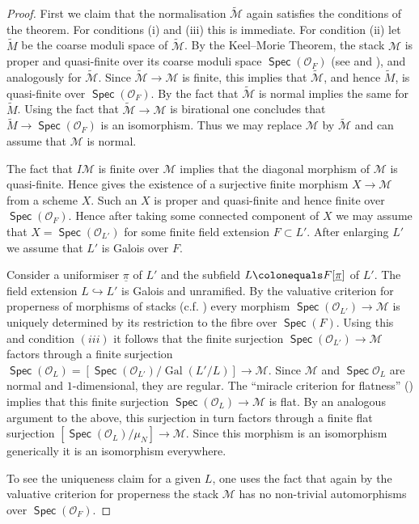 \documentclass{article}
\DeclareMathOperator{\Gal}{Gal}
\DeclareMathOperator{\Spec}{\mathsf{Spec}}
\newcommand{\CM}{{\mathcal M}}
\newcommand{\CO}{{\mathcal O}}
\newcommand{\defeq}{\colonequals}
\let\into\hookrightarrow
\theoremstyle{definition}
\theoremstyle{plain}
\begin{document}
\begin{proof}
First we claim that the normalisation $\widetilde \CM$ again satisfies the conditions of the theorem. For conditions (i) and (iii) this is immediate. For condition (ii) let $\widetilde M$ be the coarse moduli space of $\widetilde \CM$. By the Keel--Morie Theorem, the stack $\CM$ is proper and quasi-finite over its coarse moduli space $\Spec(\CO_F)$ (see \cite{MR1432041} and \cite[Theorem 1.1]{conradKM}), and analogously for $\widetilde \CM$. Since $\widetilde \CM \to \CM$ is finite, this implies that $\widetilde \CM$, and hence $\widetilde M$, is quasi-finite over $\Spec(\CO_F)$. By \cite[Theorem 4.16]{MR3237451} the fact that $\widetilde \CM$ is normal implies the same for $\widetilde M$. Using the fact that $\widetilde \CM \to \CM$ is birational one concludes that $\widetilde M \to \Spec(\CO_F)$ is an isomorphism. Thus we may replace $\CM$ by $\widetilde \CM$ and can assume that $\CM$ is normal.

The fact that $I\CM $ is finite over $\CM$ implies that the diagonal morphism of $\CM$ is quasi-finite. Hence \cite[Theorem 2.7]{MR1844577} gives the existence of a surjective finite morphism $X \to \CM$ from a scheme $X$. Such an $X$ is proper and quasi-finite and hence finite over $\Spec(\CO_F)$. Hence after taking some connected component of $X$ we may assume that $X=\Spec(\CO_{L'})$ for some finite field extension $F \subset L'$. After enlarging $L'$ we assume that $L'$ is Galois over $F$.

Consider a uniformiser $\underline{\pi}$ of $L'$ and the subfield $L\defeq F[\underline{\pi}]$ of $L'$. The field extension $L \into L'$ is Galois and unramified. By the valuative criterion for properness of morphisms of stacks (c.f. \cite[0CLY]{stacks-project}) every morphism $\Spec(\CO_{L'}) \to \CM$ is uniquely determined by its restriction to the fibre over $\Spec(F)$. Using this and condition $(iii)$ it follows that the finite surjection $\Spec(\CO_{L'}) \to \CM$ factors through a finite surjection $\Spec(\CO_L)=[\Spec(\CO_{L'})/\Gal(L'/L)] \to \CM$. Since $\CM$ and $\Spec \CO_L$ are normal and $1$-dimensional, they are regular. The ``miracle criterion for flatness'' (\cite[Theorem 23.1]{crt}) implies that this finite surjection $\Spec(\CO_L) \to \CM$ is flat. By an analogous argument to the above, this surjection in turn factors through a finite flat surjection $[\Spec(\CO_L)/\mu_N] \to \CM$. Since this morphism is an isomorphism generically it is an isomorphism everywhere.

To see the uniqueness claim for a given $L$, one uses the fact that again by the valuative criterion for properness the stack $\CM$ has no non-trivial automorphisms over $\Spec(\CO_F)$. 


\end{proof}
\end{document}
